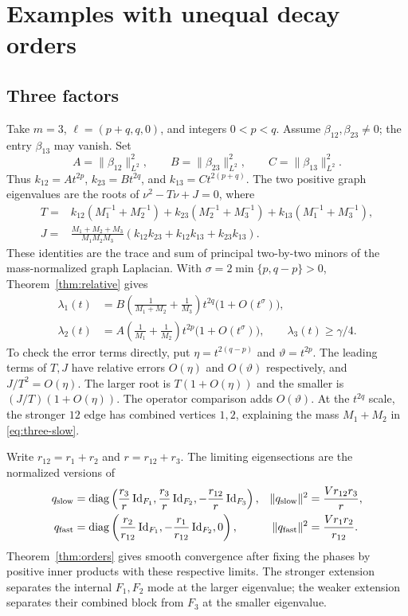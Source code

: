\section{Examples with unequal decay orders}\label{sec:examples}

\subsection{Three factors}

Take $m=3$, $\ell=(p+q,q,0)$, and integers $0<p<q$. Assume
$\beta_{12},\beta_{23}\ne0$; the entry $\beta_{13}$ may vanish. Set
\[
 A=\lVert\beta_{12}\rVert_{L^2}^2,\qquad
 B=\lVert\beta_{23}\rVert_{L^2}^2,\qquad
 C=\lVert\beta_{13}\rVert_{L^2}^2.
\]
Thus $k_{12}=At^{2p}$, $k_{23}=Bt^{2q}$, and
$k_{13}=Ct^{2(p+q)}$. The two positive graph eigenvalues are the roots
of $\nu^2-T\nu+J=0$, where
\begin{align}
 T={}&k_{12}(M_1^{-1}+M_2^{-1})
      +k_{23}(M_2^{-1}+M_3^{-1})
      +k_{13}(M_1^{-1}+M_3^{-1}),\label{eq:three-trace}\\
 J={}&\frac{M_1+M_2+M_3}{M_1M_2M_3}
       (k_{12}k_{23}+k_{12}k_{13}+k_{23}k_{13}).\label{eq:three-product}
\end{align}
These identities are the trace and sum of principal two-by-two minors
of the mass-normalized graph Laplacian. With
$\sigma=2\min\{p,q-p\}>0$, Theorem~\ref{thm:relative} gives
\begin{align}
 \lambda_1(t)&=B\left(\frac1{M_1+M_2}+\frac1{M_3}\right)
      t^{2q}\bigl(1+O(t^\sigma)\bigr),\label{eq:three-slow}\\
 \lambda_2(t)&=A\left(\frac1{M_1}+\frac1{M_2}\right)
      t^{2p}\bigl(1+O(t^\sigma)\bigr),
 \qquad\lambda_3(t)\ge\gamma/4.\label{eq:three-fast}
\end{align}
To check the error terms directly, put $\eta=t^{2(q-p)}$ and
$\vartheta=t^{2p}$. The leading terms of $T,J$ have relative errors
$O(\eta)$ and $O(\vartheta)$ respectively, and $J/T^2=O(\eta)$.
The larger root is $T(1+O(\eta))$ and the smaller is
$(J/T)(1+O(\eta))$. The operator comparison adds $O(\vartheta)$.
At the $t^{2q}$ scale, the stronger $12$ edge has combined vertices
$1,2$, explaining the mass $M_1+M_2$ in \eqref{eq:three-slow}.

Write $r_{12}=r_1+r_2$ and $r=r_{12}+r_3$. The limiting eigensections
are the normalized versions of
\begin{align*}
 q_{\rm slow}&=\operatorname{diag}\left(\frac{r_3}r\operatorname{Id}_{F_1},
                  \frac{r_3}r\operatorname{Id}_{F_2},-\frac{r_{12}}r\operatorname{Id}_{F_3}\right),
 &\lVert q_{\rm slow}\rVert^2&=\frac{Vr_{12}r_3}r,\\
 q_{\rm fast}&=\operatorname{diag}\left(\frac{r_2}{r_{12}}\operatorname{Id}_{F_1},
                  -\frac{r_1}{r_{12}}\operatorname{Id}_{F_2},0\right),
 &\lVert q_{\rm fast}\rVert^2&=\frac{Vr_1r_2}{r_{12}}.
\end{align*}
Theorem~\ref{thm:orders} gives smooth convergence after fixing the
phases by positive inner products with these respective limits.
The stronger extension separates the internal $F_1,F_2$ mode at the
larger eigenvalue; the weaker extension separates their combined block
from $F_3$ at the smaller eigenvalue.

